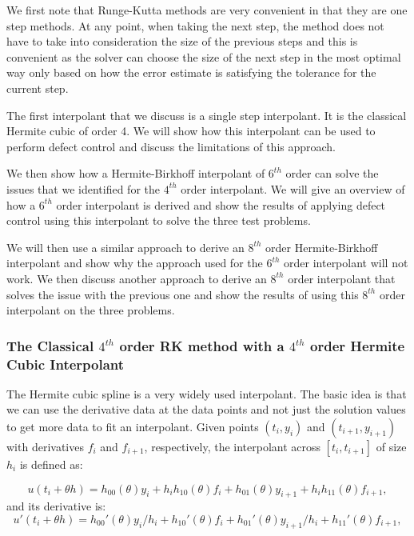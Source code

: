\documentclass{article}
\begin{document}
We first note that Runge-Kutta methods are very convenient in that they are one step methods. At any point, when taking the next step, the method does not have to take into consideration the size of the previous steps and this is convenient as the solver can choose the size of the next step in the most optimal way only based on how the error estimate is satisfying the tolerance for the current step. 

The first interpolant that we discuss is a single step interpolant. It is the classical Hermite cubic of order 4. We will show how this interpolant can be used to perform defect control and discuss the limitations of this approach. 

We then show how a Hermite-Birkhoff interpolant of $6^{th}$ order can solve the issues that we identified for the $4^{th}$ order interpolant. We will give an overview of how a $6^{th}$ order interpolant is derived and show the results of applying defect control using this interpolant to solve the three test problems. 

We will then use a similar approach to derive an $8^{th}$ order Hermite-Birkhoff interpolant and show why the approach used for the $6^{th}$ order interpolant will not work. We then discuss another approach to derive an $8^{th}$ order interpolant that solves the issue with the previous one and show the results of using this $8^{th}$ order interpolant on the three problems.


\subsubsection{The Classical $4^{th}$ order RK method with a $4^{th}$ order Hermite Cubic Interpolant}
The Hermite cubic spline is a very widely used interpolant. The basic idea is that we can use the derivative data at the data points and not just the solution values to get more data to fit an interpolant. Given points $(t_i, y_i)$ and $(t_{i + 1}, y_{i + 1})$ with derivatives $f_i$ and $f_{i + 1}$, respectively, the interpolant across $[t_i, t_{i + 1}]$ of size $h_i$ is defined as:

\begin{equation}
\label{eqn:HB4}
u(t_i + \theta h) = h_{00}(\theta)y_i +  h_ih_{10}(\theta)f_i + h_{01}(\theta)y_{i + 1} + h_ih_{11}(\theta)f_{i + 1}, 
\end{equation}
and its derivative is:
\begin{equation}
u'(t_i + \theta h) = h_{00}'(\theta)y_i/h_i +  h_{10}'(\theta)f_i + h_{01}'(\theta)y_{i + 1}/h_i + h_{11}'(\theta)f_{i + 1}, 
\end{equation}
\end{document}
